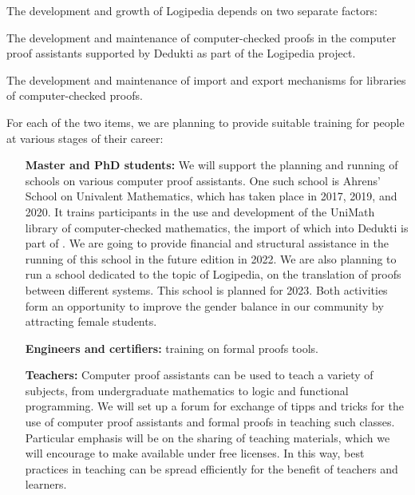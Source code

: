 \begin{workpackage}[id=dissemination,wphases=0-48,type=MGT,
  short=Dissemination,%
  title={Dissemination, communication and exploitation},
  lead=Inr]
\begin{tasklist}
  \begin{task}[id=training,
      title=Training Logipedia developers and users,
      lead=Inr,InrRM=2,IrtRM=2]
    The development and growth of Logipedia depends on two separate factors:
    \begin{compactenum}
     \item The development and maintenance of computer-checked proofs in the computer proof assistants supported by Dedukti as part of the Logipedia project.
     \item The development and maintenance of import and export mechanisms for libraries of computer-checked proofs.
    \end{compactenum}
    For each of the two items, we are planning to provide suitable training
    for people at various stages of their career:
    
    \begin{itemize}
    \item [\textbf{Master and PhD students:}] 
      We will support the planning and running of schools 
      on various computer proof assistants.
      One such school is Ahrens' School on Univalent Mathematics,
      which has taken place in 2017, 2019, and 2020.
      It trains participants in the use and development of the UniMath library of computer-checked mathematics, the import of which into Dedukti is 
      part of .
      We are going to provide financial and structural assistance in the running of this school in the future edition in 2022.
      We are also planning to run a school dedicated to the topic of Logipedia, on the translation of proofs between different systems.
      This school is planned for 2023.
      Both activities form an
      opportunity to improve the gender balance in our community by
      attracting female students.
    \item [\textbf{Engineers and certifiers:}] training on formal proofs tools.
    \item [\textbf{Teachers:}] 
       Computer proof assistants can be used to teach a variety of 
       subjects, from undergraduate mathematics to logic and functional programming.
       We will set up a forum for exchange of tipps and tricks for the use of computer proof assistants and formal proofs in teaching such classes.
       Particular emphasis will be on the sharing of teaching materials, which we will encourage to make available under free licenses.
       In this way, best practices in teaching can be spread efficiently for the benefit of teachers and learners.
    \end{itemize}
    

\end{task}
\end{tasklist}
\end{workpackage}
